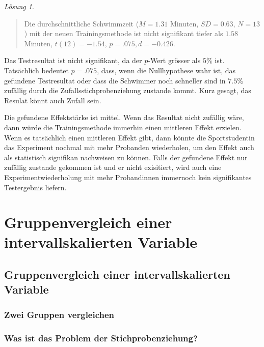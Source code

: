 \documentclass[
]{book}
\theoremstyle{definition}
\theoremstyle{definition}
\theoremstyle{definition}
\theoremstyle{definition}
\theoremstyle{remark}
\newtheorem*{solution}{Lösung}
\begin{document}
\begin{solution}
\begin{quote}
Die durchschnittliche Schwimmzeit (\(M = 1.31\) Minuten, \(SD = 0.63\), \(N = 13\)) mit der neuen Trainingsmethode ist nicht signifikant tiefer als \(1.58\) Minuten, \(t(12) = -1.54\), \(p = .075, d = -0.426\).
\end{quote}

Das Testresultat ist nicht signifikant, da der \(p\)-Wert grösser als \(5\%\) ist. Tatsächlich bedeutet \(p = .075\), dass, wenn die Nullhypothese wahr ist, das gefundene Testresultat oder dass die Schwimmer noch schneller sind in \(7.5\%\) zufällig durch die Zufallsstichprobenziehung zustande kommt. Kurz gesagt, das Resulat könnt auch Zufall sein.

Die gefundene Effektstärke ist mittel. Wenn das Resultat nicht zufällig wäre, dann würde die Trainingsmethode immerhin einen mittleren Effekt erzielen. Wenn es tatsächlich einen mittleren Effekt gibt, dann könnte die Sportstudentin das Experiment nochmal mit mehr Probanden wiederholen, um den Effekt auch als statistisch signifikan nachweisen zu können. Falls der gefundene Effekt nur zufällig zustande gekommen ist und er nicht exisitiert, wird auch eine Experimentwiederholung mit mehr Probandinnen immernoch kein signifikantes Testergebnis liefern.
\end{solution}

\part{Gruppenvergleich einer intervallskalierten Variable}\label{part-gruppenvergleich-einer-intervallskalierten-variable}

\chapter{Gruppenvergleich einer intervallskalierten Variable}\label{gruppenvergleich-einer-intervallskalierten-variable}

\section{Zwei Gruppen vergleichen}\label{zwei-gruppen-vergleichen}

\section{Was ist das Problem der Stichprobenziehung?}\label{was-ist-das-problem-der-stichprobenziehung}
\end{document}
